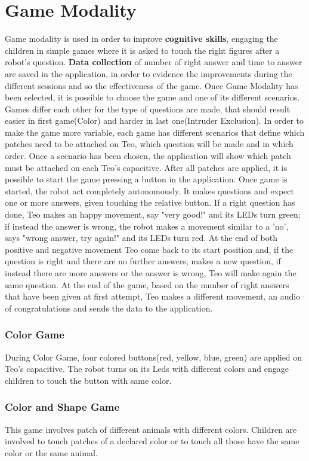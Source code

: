 \section{Game Modality}
Game modality is used in order to improve \textbf{cognitive skills}, engaging the children in simple games where it is asked to touch the right figures after a robot's question. \textbf{Data collection} of number of right answer and time to answer are saved in the application, in order to evidence the improvements during the different sessions and so the effectiveness of the game. Once Game Modality has been selected, it is possible to choose the game and one of its different scenarios. Games differ each other for the type of questions are made, that should result easier in first game(Color) and harder in last one(Intruder Exclusion). In order to make the game more variable, each game has different scenarios that define which patches need to be attached on Teo, which question will be made and in which order. Once a scenario has been chosen, the application will show which patch must be attached on each Teo's capacitive. After all patches are applied, it is possible to start the game pressing a button in the application. Once game is started, the robot act completely autonomously. It makes questions and expect one or more answers, given touching the relative button. If a right question has done, Teo makes an happy movement, say "very good!" and its LEDs turn green; if instead the answer is wrong, the robot makes a movement similar to a 'no', says "wrong answer, try again!" and its LEDs turn red. At the end of both positive and negative movement Teo come back to its start position and, if the question is right and there are no further answers, makes a new question, if instead there are more answers or the answer is wrong, Teo will make again the same question. At the end of the game, based on the number of right answers that have been given at first attempt, Teo makes a different movement, an audio of congratulations and sends the data to the application.

\subsubsection{Color Game}
During Color Game, four colored buttons(red, yellow, blue, green) are applied on Teo's capacitive. The robot turns on its Leds with different colors and engage children to touch the button with same color.
\subsubsection{Color and Shape Game}
This game involves patch of different animals with different colors. Children are involved to touch patches of a declared color or to touch all those have the same color or the same animal. 
